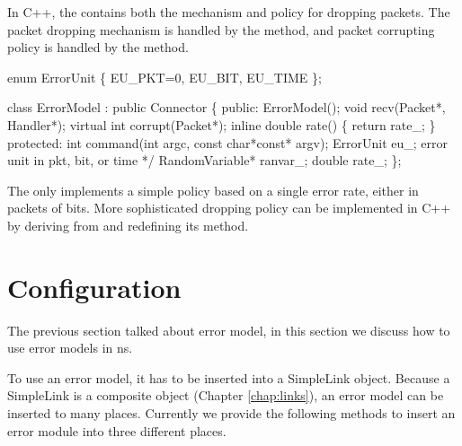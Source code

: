 In C++, the  contains both the mechanism and policy for
dropping packets.  The packet dropping mechanism is handled by the
 method, and packet corrupting policy is handled by the
 method.
\begin{program}
        enum ErrorUnit \{ EU_PKT=0, EU_BIT, EU_TIME \};

        class ErrorModel : public Connector \{
        public:
                ErrorModel();
                void recv(Packet*, Handler*);
                virtual int corrupt(Packet*);
                inline double rate() \{ return rate_; \}
        protected:
                int command(int argc, const char*const* argv);
                ErrorUnit eu_;          \* error unit in pkt, bit, or time */
                RandomVariable* ranvar_;
                double rate_;
        \};
\end{program}
The  only implements a simple policy based on a single
error rate, either in packets of bits.  More sophisticated dropping
policy can be implemented in C++ by deriving from  and
redefining its  method.


\section{Configuration}

The previous section talked about error model, in this section we
discuss how to use error models in ns. 

To use an error model, it has to be inserted into a SimpleLink
object. Because a SimpleLink is a composite object (Chapter
\ref{chap:links}), an error model can
be inserted to many places. Currently we provide the following methods
to insert an error module into three different places. 


